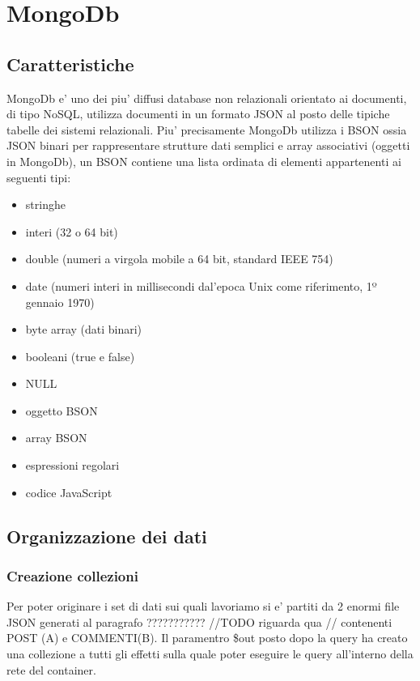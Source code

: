 \chapter{MongoDb}

\section{Caratteristiche}

MongoDb e' uno dei piu' diffusi database non relazionali orientato ai documenti, di tipo NoSQL,  utilizza documenti in un formato JSON al posto delle tipiche tabelle 
dei sistemi relazionali. Piu' precisamente MongoDb utilizza i BSON ossia JSON binari per rappresentare strutture dati semplici e array associativi (oggetti in MongoDb),
un BSON contiene una lista ordinata di elementi appartenenti ai seguenti tipi:

\begin{itemize}{}{}
    \item stringhe
    \item interi (32 o 64 bit)
    \item double (numeri a virgola mobile a 64 bit, standard IEEE 754)
    \item date (numeri interi in millisecondi dal'epoca Unix come riferimento, 1º gennaio 1970)
    \item byte array (dati binari)
    \item booleani (true e false)
    \item NULL
    \item oggetto BSON
    \item array BSON
    \item espressioni regolari
    \item codice JavaScript
\end{itemize}

\section{Organizzazione dei dati}

\subsection{Creazione collezioni}

Per poter originare i set di dati sui quali lavoriamo si e' partiti da 2 enormi file JSON generati al paragrafo ??????????? //TODO riguarda qua //
contenenti POST (A) e COMMENTI(B). Il paramentro \$out posto dopo la query ha creato una collezione a tutti gli effetti sulla quale poter eseguire le query
all'interno della rete del container.

